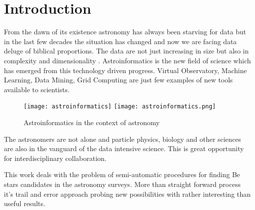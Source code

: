 \chapter*{Introduction}
\fancyhead{}
\fancyhead{}


\renewcommand{\LettrineFontHook}{\color{red}}


\lettrine[lines = 3, loversize=-0.1, lraise=0.1]{F}{}rom the dawn of
its existence astronomy has always been starving for data but in the
last few decades the situation has changed and now we are facing data
deluge of biblical proportions. The data are not just increasing in
size but also in complexity and dimensionality
\citep{ballastroinformatics}. Astroinformatics is the new field of
science which has emerged from this technology driven progress.
Virtual Observatory, Machine Learning, Data Mining, Grid Computing are
just few examples of new tools available to scientists.


\vspace{10pt}
\begin{figure}[!htbp]
  \begin{center}
    \leavevmode
    \ifpdf
    \texttt{[image: astroinformatics]}
    \else
    \texttt{[image: astroinformatics.png]}
    \fi
    \caption{Astroinformatics in the context of astronomy \citep{ballastroinformatics} }
    \label{FigAir}
  \end{center}
\end{figure}
\vspace{-10pt}



The astronomers are not alone and particle physics, biology and other
sciences are also in the vanguard of the data intensive science. This
is great opportunity for interdisciplinary collaboration.

This work deals with the problem of semi-automatic procedures for
finding Be stars \citep{porter2003classical} candidates in the
astronomy surveys. More than straight forward process it's trail and
error approach probing new possibilities with rather interesting than
useful results.

